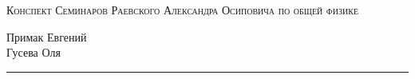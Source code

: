 
\begin{center}
    \LARGE \textsc{Конспект Семинаров Раевского Александра Осиповича по общей физике}
\end{center}

\begin{flushright}
	Примак Евгений\\
	Гусева Оля
\end{flushright}

\hrule

\phantom{42}

\newpage